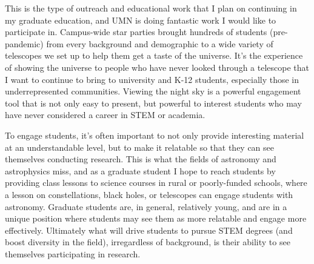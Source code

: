 \documentclass[11pt,letterpaper]{article}
\begin{document}
This is the type of outreach and educational work that I plan on continuing in my graduate education, and UMN is doing fantastic work I would like to participate in. Campus-wide star parties brought hundreds of students (pre-pandemic) from every background and demographic to a wide variety of telescopes we set up to help them get a taste of the universe. It’s the experience of showing the universe to people who have never looked through a telescope that I want to continue to bring to university and K-12 students, especially those in underrepresented communities. Viewing the night sky is a powerful engagement tool that is not only easy to present, but powerful to interest students who may have never considered a career in STEM or academia.

To engage students, it's often important to not only provide interesting material at an understandable level, but to make it relatable so that they can see themselves conducting research. This is what the fields of astronomy and astrophysics miss, and as a graduate student I hope to reach students by providing class lessons to science courses in rural or poorly-funded schools, where a lesson on constellations, black holes, or telescopes can engage students with astronomy. Graduate students are, in general, relatively young, and are in a unique position where students may see them as more relatable and engage more effectively. Ultimately what will drive students to pursue STEM degrees (and boost diversity in the field), irregardless of background, is their ability to see themselves participating in research.
\end{document}
